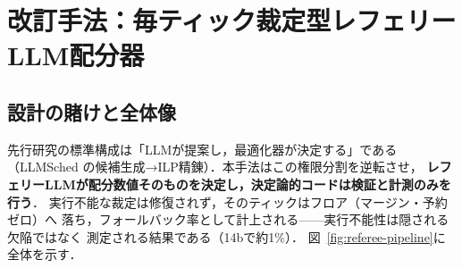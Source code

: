 
\section{改訂手法：毎ティック裁定型レフェリーLLM配分器}
\label{sec:method-referee}

\subsection{設計の賭けと全体像}
先行研究の標準構成は「LLMが提案し，最適化器が決定する」である
（LLMSched の候補生成→ILP精錬）．本手法はこの権限分割を逆転させ，
\textbf{レフェリーLLMが配分数値そのものを決定し，決定論的コードは検証と計測のみを行う}．
実行不能な裁定は修復されず，そのティックはフロア（マージン・予約ゼロ）へ
落ち，フォールバック率として計上される——実行不能性は隠される欠陥ではなく
測定される結果である（14bで約1\%）．
図~\ref{fig:referee-pipeline}に全体を示す．

